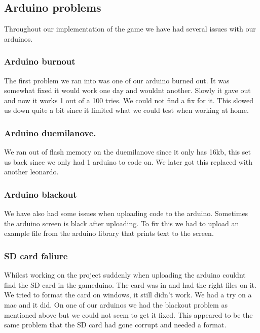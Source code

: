 \subsection{Arduino problems}
Throughout our implementation of the game we have had several issues with our arduinos.

\subsubsection{Arduino burnout}
The first problem we ran into was one of our arduino burned out. It was somewhat fixed it would work one day and wouldnt another. Slowly it gave out and now it works 1 out of a 100 tries. We could not find a fix for it. This slowed us down quite a bit since it limited what we could test when working at home.
\subsubsection{Arduino duemilanove.}
We ran out of flash memory on the duemilanove since it only has 16kb, this set us back since we only had 1 arduino to code on. We later got this replaced with another leonardo.
\subsubsection{Arduino blackout}
We have also had some issues when uploading code to the arduino. Sometimes the arduino screen is black after uploading. To fix this we had to upload an example file from the arduino library that prints text to the screen.
\subsubsection{SD card faliure}
Whilest working on the project suddenly when uploading the arduino couldnt find the SD card in the gameduino. The card was in and had the right files on it. We tried to format the card on windows, it still didn't work. We had a try on a mac and it did.
On one of our arduinos we had the blackout problem as mentioned above but we could not seem to get it fixed. This appeared to be the same problem that the SD card had gone corrupt and needed a format.


